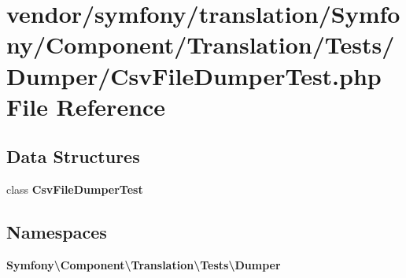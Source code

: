 \section{vendor/symfony/translation/\+Symfony/\+Component/\+Translation/\+Tests/\+Dumper/\+Csv\+File\+Dumper\+Test.php File Reference}
\label{_csv_file_dumper_test_8php}
\subsection*{Data Structures}
\begin{DoxyCompactItemize}
\item 
class {\bf Csv\+File\+Dumper\+Test}
\end{DoxyCompactItemize}
\subsection*{Namespaces}
\begin{DoxyCompactItemize}
\item 
 {\bf Symfony\textbackslash{}\+Component\textbackslash{}\+Translation\textbackslash{}\+Tests\textbackslash{}\+Dumper}
\end{DoxyCompactItemize}
